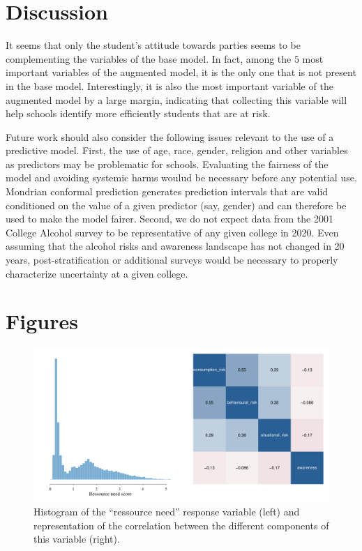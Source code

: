 \documentclass[10pt]{amsart}%
\begin{document}
\section{Discussion}
\label{sec:disc}

It seems that only the student's attitude towards parties seems to be complementing the variables of the base model. In fact, among the $5$ most important variables of the augmented model, it is the only one that is not present in the base model. Interestingly, it is also the most important variable of the augmented model by a large margin, indicating that collecting this variable will help schools identify more efficiently students that are at risk.

Future work should also consider the following issues relevant to the use of a predictive model. First, the use of age, race, gender, religion and other variables as predictors may be  problematic for schools. Evaluating the fairness of the model and avoiding systemic harms woulud be necessary before any potential use. Mondrian conformal prediction \cite{Vovk.2005} generates prediction intervals that are valid conditioned on the value of a given predictor (say, gender) and can therefore be used to make the model fairer. Second, we do not expect data from the 2001 College Alcohol survey to be representative of any given college in 2020. Even assuming that the alcohol risks and awareness landscape has not changed in 20 years, post-stratification or additional surveys would be necessary to properly characterize uncertainty at a given college.





\newpage
\appendix

\section{Figures}

\begin{center}
\begin{figure}[h]
  \includegraphics[width=\linewidth]{Figures/response.pdf}
  \caption{Histogram of the ``ressource need'' response variable (left) and representation of the correlation between the different components of this variable (right).}
  \label{fig:resp}
\end{figure}
\end{center}
\end{document}
